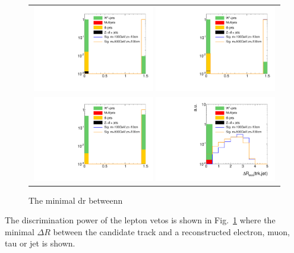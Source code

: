 \begin{figure}[!b]
  \centering 
  \begin{tabular}{c}
    \includegraphics[width=0.49\textwidth]{figures/analysis/AnalysisSelection/htrackdRminElec_log.pdf}
    \includegraphics[width=0.49\textwidth]{figures/analysis/AnalysisSelection/htrackdRminMuon_log.pdf}\\

    \includegraphics[width=0.49\textwidth]{figures/analysis/AnalysisSelection/htrackdRminTau_log.pdf}
    \includegraphics[width=0.49\textwidth]{figures/analysis/AnalysisSelection/htrackdRminJet_log.pdf}
  \end{tabular}
  \caption{The minimal dr betweenn}
  \label{fig:TrackdRmin}
\end{figure}
The discrimination power of the lepton vetos is shown in Fig.~\ref{fig:TrackdRmin} where the minimal $\Delta R$ between the candidate track and a reconstructed electron, muon, tau or jet is shown.\\

